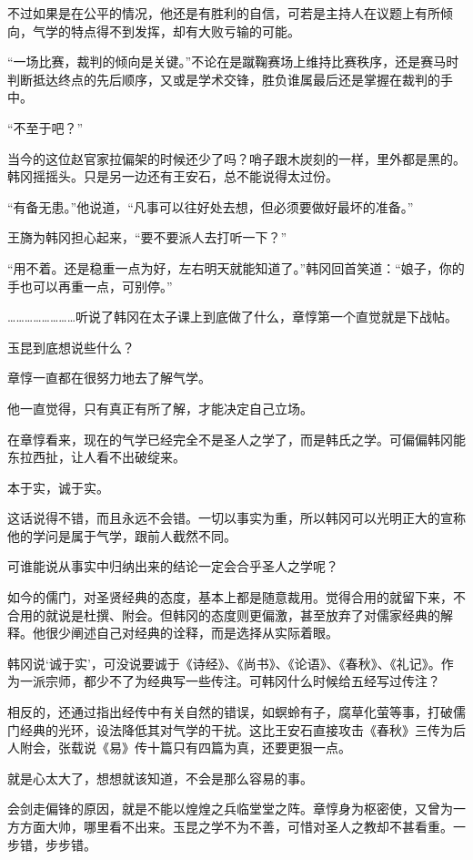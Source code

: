 不过如果是在公平的情况，他还是有胜利的自信，可若是主持人在议题上有所倾向，气学的特点得不到发挥，却有大败亏输的可能。

“一场比赛，裁判的倾向是关键。”不论在是蹴鞠赛场上维持比赛秩序，还是赛马时判断抵达终点的先后顺序，又或是学术交锋，胜负谁属最后还是掌握在裁判的手中。

“不至于吧？”

当今的这位赵官家拉偏架的时候还少了吗？哨子跟木炭刻的一样，里外都是黑的。韩冈摇摇头。只是另一边还有王安石，总不能说得太过份。

“有备无患。”他说道，“凡事可以往好处去想，但必须要做好最坏的准备。”

王旖为韩冈担心起来，“要不要派人去打听一下？”

“用不着。还是稳重一点为好，左右明天就能知道了。”韩冈回首笑道：“娘子，你的手也可以再重一点，可别停。”

……………………听说了韩冈在太子课上到底做了什么，章惇第一个直觉就是下战帖。

玉昆到底想说些什么？

章惇一直都在很努力地去了解气学。

他一直觉得，只有真正有所了解，才能决定自己立场。

在章惇看来，现在的气学已经完全不是圣人之学了，而是韩氏之学。可偏偏韩冈能东拉西扯，让人看不出破绽来。

本于实，诚于实。

这话说得不错，而且永远不会错。一切以事实为重，所以韩冈可以光明正大的宣称他的学问是属于气学，跟前人截然不同。

可谁能说从事实中归纳出来的结论一定会合乎圣人之学呢？

如今的儒门，对圣贤经典的态度，基本上都是随意裁用。觉得合用的就留下来，不合用的就说是杜撰、附会。但韩冈的态度则更偏激，甚至放弃了对儒家经典的解释。他很少阐述自己对经典的诠释，而是选择从实际着眼。

韩冈说‘诚于实’，可没说要诚于《诗经》、《尚书》、《论语》、《春秋》、《礼记》。作为一派宗师，都少不了为经典写一些传注。可韩冈什么时候给五经写过传注？

相反的，还通过指出经传中有关自然的错误，如螟蛉有子，腐草化萤等事，打破儒门经典的光环，设法降低其对气学的干扰。这比王安石直接攻击《春秋》三传为后人附会，张载说《易》传十篇只有四篇为真，还要更狠一点。

就是心太大了，想想就该知道，不会是那么容易的事。

会剑走偏锋的原因，就是不能以煌煌之兵临堂堂之阵。章惇身为枢密使，又曾为一方方面大帅，哪里看不出来。玉昆之学不为不善，可惜对圣人之教却不甚看重。一步错，步步错。

